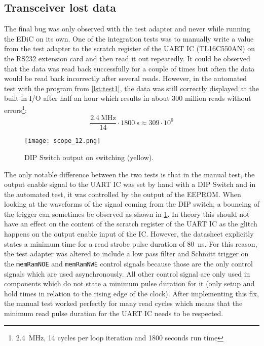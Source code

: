 \subsection{ Transceiver lost data}
The final bug was only observed with the test adapter and never while running the \gls{EDiC} on its own.
One of the integration tests was to manually write a value from the test adapter to the scratch register of the \gls{UART} \gls{IC} (TL16C550AN) on the RS232 extension card and then read it out repeatedly.
It could be observed that the data was read back successfully for a couple of times but often the data would be read back incorrectly after several reads.
However, in the automated test with the program from \cref{lst:test1}, the data was still correctly displayed at the built-in I/O after half an hour which results in about 300 million reads without errors\footnote{\qty{2.4}{\mega\hertz}, 14 cycles per loop iteration and 1800 seconds run time}:
\begin{equation}
  \frac{\qty{2.4}{\mega\hertz}}{14}\cdot\qty{1800}{\second}\approx 309\cdot 10^6
\end{equation}

\begin{figure}[t]
  \texttt{[image: scope\_12.png]}
  \caption{DIP Switch output on switching (yellow).}
  \label{fig:bounce}
\end{figure}
The only notable difference between the two tests is that in the manual test, the output enable signal to the \gls{UART} \gls{IC} was set by hand with a DIP Switch and in the automated test, it was controlled by the output of the \gls{EEPROM}.
When looking at the waveforms of the signal coming from the DIP switch, a bouncing of the trigger can sometimes be observed as shown in \cref{fig:bounce}.
In theory this should not have an effect on the content of the scratch register of the \gls{UART} \gls{IC} as the glitch happens on the output enable input of the \gls{IC}.
However, the datasheet explicitly states a minimum time for a read strobe pulse duration of \qty{80}{\nano\second}.
For this reason, the test adapter was altered to include a low pass filter and Schmitt trigger on the \texttt{memRamNOE} and \texttt{memRamNWE} control signals because those are the only control signals which are used asynchronously.
All other control signal are only used in components which do not state a minimum pulse duration for it (only setup and hold times in relation to the rising edge of the clock).
After implementing this fix, the manual test worked perfectly for many read cycles which means that the minimum read pulse duration for the \gls{UART} \gls{IC} needs to be respected.


